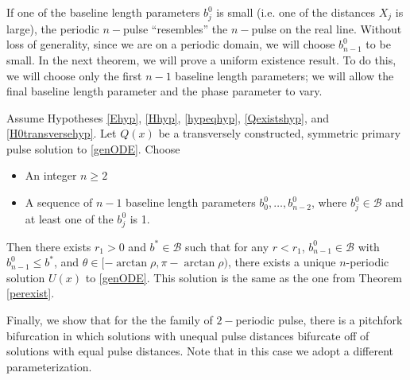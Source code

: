 \documentclass[thesis.tex]{subfiles}
\begin{document}
If one of the baseline length parameters $b_j^0$ is small (i.e. one of the distances $X_j$ is large), the periodic $n-$pulse ``resembles'' the $n-$pulse on the real line. Without loss of generality, since we are on a periodic domain, we will choose $b_{n-1}^0$ to be small. In the next theorem, we will prove a uniform existence result. To do this, we will choose only the first $n-1$ baseline length parameters; we will allow the final baseline length parameter and the phase parameter to vary. 

\begin{theorem}\label{unifperexist}
Assume Hypotheses \ref{Ehyp}, \ref{Hhyp}, \ref{hypeqhyp}, \ref{Qexistshyp}, and \ref{H0transversehyp}. Let $Q(x)$ be a transversely constructed, symmetric primary pulse solution to \eqref{genODE}. Choose
\begin{itemize}
\item An integer $n \geq 2$ 
\item A sequence of $n-1$ baseline length parameters $b_0^0, \dots, b_{n-2}^0$, where $b_j^0 \in \mathcal{B}$ and at least one of the $b_j^0$ is 1.
\end{itemize}
Then there exists $r_1 > 0$ and $b^* \in \mathcal{B}$ such that for any $r < r_1$, $b_{n-1}^0 \in \mathcal{B}$ with $b_{n-1}^0 \leq b^*$, and $\theta \in [-\arctan \rho, \pi - \arctan \rho)$, there exists a unique $n$-periodic solution $U(x)$ to \eqref{genODE}. This solution is the same as the one from Theorem \ref{perexist}.
\end{theorem}

Finally, we show that for the the family of $2-$periodic pulse, there is a pitchfork bifurcation in which solutions with unequal pulse distances bifurcate off of solutions with equal pulse distances. Note that in this case we adopt a different parameterization.
\end{document}
